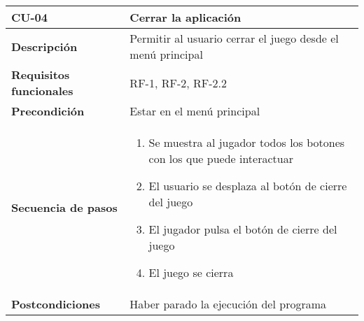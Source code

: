\begin{tabularx}{\columnwidth}{l|l}
\begin{minipage}{0.25\columnwidth}
\textbf{CU-04} 
\end{minipage}
&
\begin{minipage}{0.65\columnwidth}
Cerrar la aplicación
\end{minipage}
\\ \hline

\begin{minipage}{0.25\columnwidth}
\textbf{Descripción} 
\end{minipage}
&
\begin{minipage}{0.65\columnwidth}
Permitir al usuario cerrar el juego desde el menú principal
\end{minipage}
\\ \hline

\begin{minipage}{0.25\columnwidth}
\textbf{Requisitos funcionales} 
\end{minipage}
&
\begin{minipage}{0.65\columnwidth}
RF-1, RF-2, RF-2.2
\end{minipage}
\\ \hline

\begin{minipage}{0.25\columnwidth}
\textbf{Precondición} 
\end{minipage}
&
\begin{minipage}{0.65\columnwidth}
Estar en el menú principal
\end{minipage}
\\ \hline

\begin{minipage}{0.25\columnwidth}
\textbf{Secuencia de pasos} 
\end{minipage}
&
\begin{minipage}{0.65\columnwidth}
\begin{enumerate}
\item
Se muestra al jugador todos los botones con los que puede interactuar
\item
El usuario se desplaza al botón de cierre del juego
\item
El jugador pulsa el botón de cierre del juego
\item
El juego se cierra
\end{enumerate}
\end{minipage}
\\ \hline

\begin{minipage}{0.25\columnwidth}
\textbf{Postcondiciones} 
\end{minipage}
&
\begin{minipage}{0.65\columnwidth}
Haber parado la ejecución del programa
\end{minipage}
\\ \hline


\end{tabularx}
